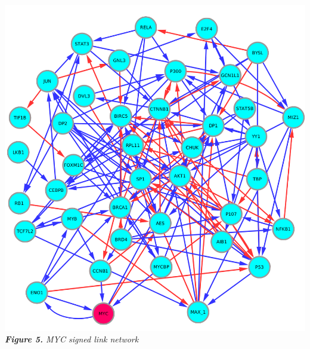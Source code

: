\documentclass[a0paper,portrait]{baposter}
\begin{document}
\begin{poster}
{\begin{minipage}[t]{0.15\textwidth}
 \includegraphics[width=.8\textwidth]{1031_c.png}\\ \small \textit{\textbf{Figure 5.} MYC signed link network}
\end{minipage}
  
%
%
%


}




\end{poster}
\end{document}
